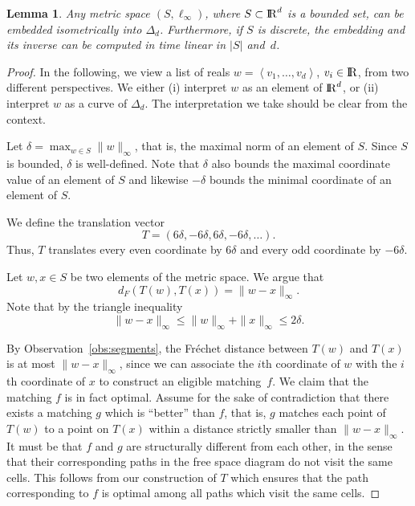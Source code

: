 \documentclass[11pt, letter]{article}
\newtheorem{lemma}[theorem]{Lemma}
\newcommand{\lemlab}[1]{\label{lemma:#1}}
\newcommand{\obsref}[1]{Observation~\ref{obs:#1}}
\newcommand{\Frechet}{Fr\'echet\xspace}
\providecommand{\pth}[2][\!]{#1\left({#2}\right)}
\providecommand{\cbrc}[1]{\left\langle{#1}\right\rangle}
\renewcommand{\Re}{{\rm I\!\hspace{-0.025em} R}}
\newcommand{\distFr}[2]{\ensuremath{d_F\pth{#1,#2}}}
\begin{document}
\begin{lemma}\lemlab{embedding}
Any metric space $(S,\ell_{\infty})$, where $S \subset \Re^d$ is a bounded set, can be embedded
isometrically into $\Delta_{d}$. Furthermore, if $S$ is discrete, the embedding
and its inverse can be computed in time linear in $|S|$ and~$d$.  \end{lemma}
\begin{proof}
In the following, we view a list of reals $w=\cbrc{v_1,\dots,v_d}$, $v_i \in \Re$, 
from two different perspectives. We either (i) interpret $w$ as an element of $\Re^d$, 
or (ii) interpret $w$ as a curve of $\Delta_d$.
The interpretation we take should be clear from the context. 
 
Let $\delta= \max_{w \in S}  \|w\|_{\infty}$, that is, the maximal norm of an
element of $S$.  Since $S$ is bounded, $\delta$ is well-defined. Note that
$\delta$ also bounds the maximal coordinate value of an element of $S$ and
likewise $-\delta$ bounds the minimal coordinate of an element of $S$.  

We define the
translation vector \[ T= \pth{6\delta,-6\delta,6\delta,-6\delta, \dots }. \] 
Thus, $T$ translates every even coordinate by $6\delta$ and every odd
coordinate by $-6\delta$. 

Let $w,x \in S$ be two elements of the metric space. 
We argue that \[\distFr{T(w)}{ T(x)} = \|w-x\|_{\infty}. \]
Note that by the triangle inequality 
\[\| w-x\|_{\infty} \leq \|w\|_{\infty} + \|x\|_{\infty} \leq 2\delta.\]

By \obsref{segments}, the \Frechet distance between $T(w)$
and $T(x)$ is at most $\| w-x\|_{\infty}$, since we can associate the
$i$th coordinate of $w$ with the $i$th coordinate of $x$ to construct an
eligible matching~$f$.  We claim that the matching $f$ is in fact optimal.
Assume for the sake of contradiction that there exists a matching $g$ which is
``better'' than $f$, that is, $g$ matches each point of $T(w)$ to a
point on $T(x)$ within a distance strictly smaller than $\| w-x\|_{\infty}$.
It must be that $f$ and $g$ are structurally different from each other, in the
sense that their corresponding paths in the free space diagram do not visit the
same cells. This follows from our construction of $T$ which ensures that the
path corresponding to $f$ is optimal among all paths which visit the same cells.


\end{proof}
\end{document}
